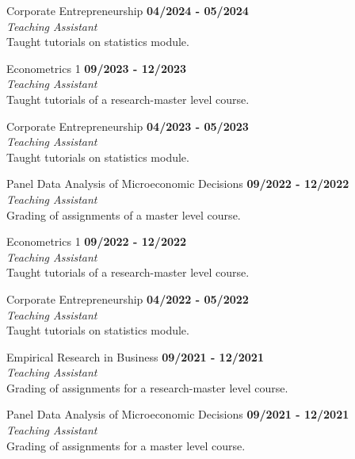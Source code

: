\documentclass[margin,line]{res}
\begin{document}
\begin{resume}
\vspace{-.3cm}
Corporate Entrepreneurship \hfill {\bf 04/2024 - 05/2024}\\
 {\itshape Teaching Assistant}\\
Taught tutorials on statistics module.

\vspace{-.3cm}
Econometrics 1 \hfill {\bf 09/2023 - 12/2023}\\
{\itshape Teaching Assistant}\\
Taught tutorials of a research-master level course.

\vspace{-.3cm}
Corporate Entrepreneurship \hfill {\bf 04/2023 - 05/2023}\\
 {\itshape Teaching Assistant}\\
Taught tutorials on statistics module.


\vspace{-.3cm}
Panel Data Analysis of Microeconomic Decisions \hfill {\bf 09/2022 - 12/2022}\\
{\itshape Teaching Assistant}\\
Grading of assignments of a master level course.

\vspace{-.3cm}
Econometrics 1 \hfill {\bf 09/2022 - 12/2022}\\
{\itshape Teaching Assistant}\\
Taught tutorials of a research-master level course.

\vspace{-.3cm}
Corporate Entrepreneurship \hfill {\bf 04/2022 - 05/2022}\\
 {\itshape Teaching Assistant}\\
Taught tutorials on statistics module.


\vspace{-.3cm}
Empirical Research in Business \hfill {\bf 09/2021 - 12/2021}\\
{\itshape Teaching Assistant}\\
Grading of assignments for a research-master level course.

\vspace{-.3cm}
Panel Data Analysis of Microeconomic Decisions \hfill {\bf 09/2021 - 12/2021}\\
{\itshape Teaching Assistant}\\
Grading of assignments for a master level course.



\end{resume}
\end{document}
